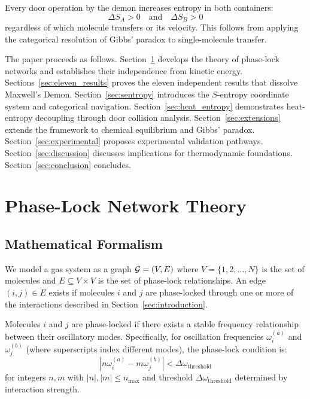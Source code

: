 \begin{theorem}
\label{thm:symmetric_entropy}
Every door operation by the demon increases entropy in both containers:
\begin{equation}
\Delta S_A > 0 \quad \text{and} \quad \Delta S_B > 0
\label{eq:symmetric_entropy}
\end{equation}
regardless of which molecule transfers or its velocity. This follows from applying the categorical resolution of Gibbs' paradox to single-molecule transfer.
\end{theorem}

The paper proceeds as follows. Section~\ref{sec:phase_lock} develops the theory of phase-lock networks and establishes their independence from kinetic energy. Sections~\ref{sec:eleven_results} proves the eleven independent results that dissolve Maxwell's Demon. Section~\ref{sec:sentropy} introduces the $S$-entropy coordinate system and categorical navigation. Section~\ref{sec:heat_entropy} demonstrates heat-entropy decoupling through door collision analysis. Section~\ref{sec:extensions} extends the framework to chemical equilibrium and Gibbs' paradox. Section~\ref{sec:experimental} proposes experimental validation pathways. Section~\ref{sec:discussion} discusses implications for thermodynamic foundations. Section~\ref{sec:conclusion} concludes.

\section{Phase-Lock Network Theory}
\label{sec:phase_lock}

\subsection{Mathematical Formalism}

We model a gas system as a graph $\mathcal{G} = (V, E)$ where $V = \{1, 2, \ldots, N\}$ is the set of molecules and $E \subseteq V \times V$ is the set of phase-lock relationships. An edge $(i, j) \in E$ exists if molecules $i$ and $j$ are phase-locked through one or more of the interactions described in Section~\ref{sec:introduction}.

\begin{definition}
\label{def:phase_lock}
Molecules $i$ and $j$ are phase-locked if there exists a stable frequency relationship between their oscillatory modes. Specifically, for oscillation frequencies $\omega_i^{(a)}$ and $\omega_j^{(b)}$ (where superscripts index different modes), the phase-lock condition is:
\begin{equation}
\left| n\omega_i^{(a)} - m\omega_j^{(b)} \right| < \Delta\omega_{\text{threshold}}
\label{eq:phase_lock_condition}
\end{equation}
for integers $n, m$ with $|n|, |m| \leq n_{\max}$ and threshold $\Delta\omega_{\text{threshold}}$ determined by interaction strength.
\end{definition}

